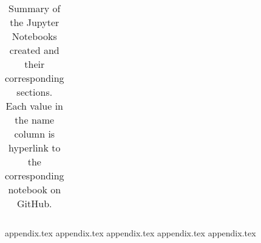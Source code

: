\begin{appendices}
\begin{table}[H]
\begin{tabularx}{\textwidth}{>{\hsize=0.8\hsize}X|>{\hsize=0.5\hsize}X|>{\hsize=1.7\hsize}X}
        \bottomrule
    \end{tabularx}
    \caption{Summary of the Jupyter Notebooks created and their corresponding sections. Each value in the name column is hyperlink to the corresponding notebook on GitHub.}
    \label{tab:ap:software}
\end{table}



{appendix.tex}
{appendix.tex}
{appendix.tex}
{appendix.tex}
{appendix.tex}



\end{appendices}
